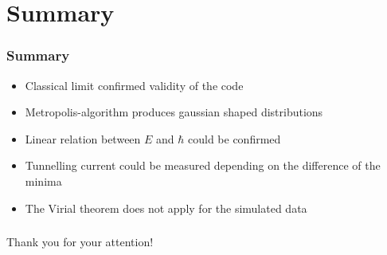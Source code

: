 \documentclass[aspectratio=169]{beamer}
\begin{document}
\section{Summary}
\begin{frame}
	\frametitle{Summary}
	\begin{itemize}
		\item Classical limit confirmed validity of the code
		\item Metropolis-algorithm produces gaussian shaped distributions
		\item Linear relation between $E$ and $\hbar$ could be confirmed
		\item Tunnelling current could be measured depending on the difference of the minima
		\item The Virial theorem does not apply for the simulated data
	\end{itemize}
\end{frame}


\begin{frame}
\frametitle{}
\begin{center}
	Thank you for your attention!
\end{center}
\end{frame}
\end{document}

